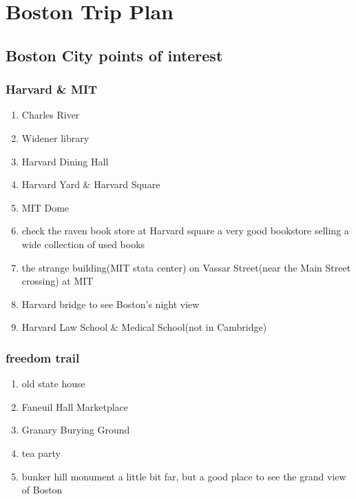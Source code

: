 \documentclass[11pt]{article}
\author{Chuan Liu}
\date{\today}
\title{}
\begin{document}
\tableofcontents

\section{Boston Trip Plan}
\label{sec:orgheadline36}

\subsection{Boston City points of interest}
\label{sec:orgheadline32}

\subsubsection{Harvard \& MIT}
\label{sec:orgheadline10}

\begin{enumerate}
\item Charles River
\label{sec:orgheadline1}
\item Widener library
\label{sec:orgheadline2}
\item Harvard Dining Hall
\label{sec:orgheadline3}
\item Harvard Yard \& Harvard Square
\label{sec:orgheadline4}
\item MIT Dome
\label{sec:orgheadline5}
\item check the raven book store at Harvard square
\label{sec:orgheadline6}
a very good bookstore selling a wide collection of used books 
\item the strange building(MIT stata center) on Vassar Street(near the Main Street crossing) at MIT
\label{sec:orgheadline7}

\item Harvard bridge to see Boston's night view
\label{sec:orgheadline8}

\item Harvard Law School \& Medical School(not in Cambridge)
\label{sec:orgheadline9}
\end{enumerate}
\subsubsection{freedom trail}
\label{sec:orgheadline16}

\begin{enumerate}
\item old state house
\label{sec:orgheadline11}
\item Faneuil Hall Marketplace
\label{sec:orgheadline12}
\item Granary Burying Ground
\label{sec:orgheadline13}
\item tea party
\label{sec:orgheadline14}
\item bunker hill monument
\label{sec:orgheadline15}
a little bit far, but a good place to see the grand view of Boston
\end{enumerate}
\end{document}
